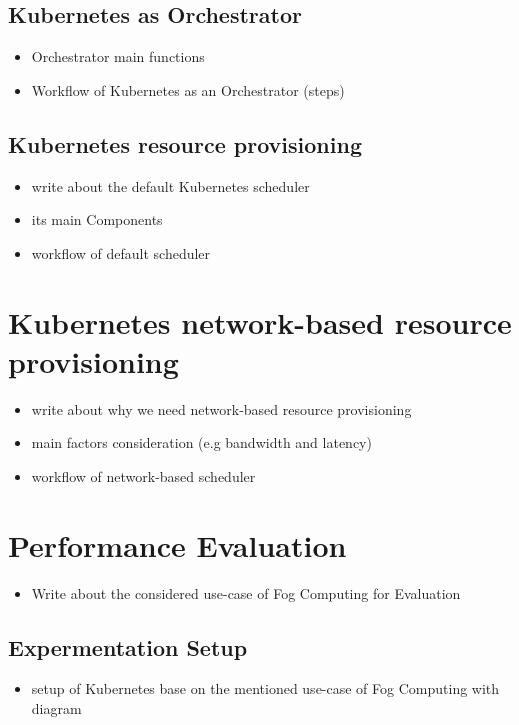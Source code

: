 \subsection{Kubernetes as Orchestrator}
\label{sec:k8s_orchestrator}
\begin{itemize}
  \item Orchestrator main functions
  \item Workflow of Kubernetes as an Orchestrator (steps)
\end{itemize}

\subsection{Kubernetes resource provisioning}
\label{sec:k8s_scheduler}
\begin{itemize}
  \item write about the default Kubernetes scheduler
  \item its main Components
  \item workflow of default scheduler
\end{itemize}

\section{Kubernetes network-based resource provisioning}
\label{sec: k8s_ns}
\begin{itemize}
  \item write about why we need network-based resource provisioning
  \item main factors consideration (e.g bandwidth and latency)
  \item workflow of network-based scheduler
\end{itemize}

\section{Performance Evaluation}
\label{sec:Performance_eval}
\begin{itemize}
  \item Write about the considered use-case of Fog Computing for Evaluation
\end{itemize}
\subsection{Expermentation Setup}
\label{sec:setup}
\begin{itemize}
  \item setup of Kubernetes base on the mentioned use-case of Fog Computing with diagram
\end{itemize}

